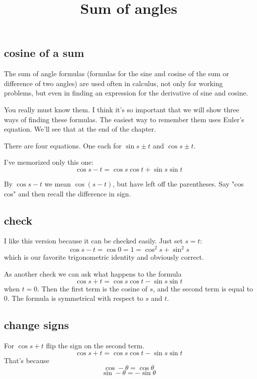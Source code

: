 \documentclass[11pt, oneside]{article}
\title{Sum of angles}
\date{}
\begin{document}
\maketitle
\Large


\label{sec:sum_angles_similar_tri}

\subsection*{cosine of a sum}

The sum of angle formulas (formulas for the sine and cosine of the sum or difference of two angles) are used often in calculus, not only for working problems, but even in finding an expression for the derivative of sine and cosine.

You really must know them.  I think it's so important that we will show three ways of finding these formulas.  The easiest way to remember them uses Euler's equation.  We'll see that at the end of the chapter.

There are four equations.  One each for $\sin s \pm t$ and $\cos s \pm t$.

I've memorized only this one:
\[ \cos s - t = \cos s \cos t + \sin s \sin t \]

By $\cos s - t$ we mean $\cos (s - t)$, but have left off the parentheses.  Say "cos cos" and then recall the difference in sign.

\subsection*{check}

I like this version because it can be checked easily.  Just set $s = t$:
\[ \cos s - t = \cos 0 = 1 = \cos^2 s + \sin^2 s \]
which is our favorite trigonometric identity and obviously correct.

As another check we can ask what happens to the formula 
\[ \cos s + t = \cos s \cos t - \sin s \sin t \]
when $t = 0$.  Then the first term is the cosine of $s$, and the second term is equal to $0$.  The formula is symmetrical with respect to $s$ and $t$.

\subsection*{change signs}

For $\cos s + t $ flip the sign on the second term.  
\[ \cos s + t = \cos s \cos t - \sin s \sin t \]
That's because
\[ \cos -\theta = \cos \theta \]
\[ \sin - \theta = - \sin \theta \]
\end{document}
